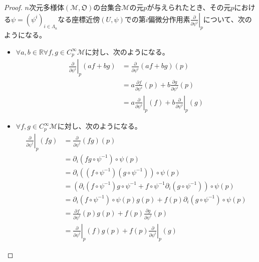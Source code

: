 \documentclass[dvipdfmx]{jsarticle}
\begin{document}
\begin{proof}
  $n$次元多様体$\left(\mathcal{M},\mathfrak{O}\right)$の台集合$\mathcal{M}$の元$p$が与えられたとき、その元$p$における$\psi =\left(\psi^i \right)_{i\in \varLambda_n }$なる座標近傍$\left(U,\psi\right)$での第$i$偏微分作用素$\left. \frac{\partial}{\partial \psi^i }\right|_p $について、次のようになる。
  \begin{itemize}
    \item $\forall a,b\in \mathbb{R} \forall f,g \in C^\infty_p \mathcal{M} $に対し、次のようになる。
    \begin{align*}
      \left. \frac{\partial}{\partial \psi^i }\right|_p \left(af+bg\right) &= \frac{\partial }{\partial \psi^i } \left(af+bg\right) \left(p\right) \\
      &=a\frac{\partial f}{\partial \psi^i } \left(p\right) +b\frac{\partial g}{\partial \psi^i }\left(p\right) \\
      &=a\left. \frac{\partial }{\partial \psi^i } \right|_p \left(f\right) +b\left. \frac{\partial }{\partial \psi^i } \right|_p \left(g\right) 
    \end{align*}
    \item $\forall f,g \in C^\infty_p \mathcal{M} $に対し、次のようになる。
    \begin{align*}
      \left. \frac{\partial}{\partial \psi^i }\right|_p \left(fg\right) &= \frac{\partial }{\partial \psi^i } \left(fg\right) \left(p\right) \\
      &= \partial_i \left(fg\circ \psi^{-1} \right) \circ \psi \left(p\right) \\
      &= \partial_i \left(\left(f\circ \psi^{-1} \right) \left(g\circ \psi^{-1} \right)\right) \circ \psi \left(p\right) \\
      &= \left( \partial_i \left(f\circ \psi^{-1} \right) g\circ \psi^{-1} +f\circ \psi^{-1} \partial_i \left(g\circ \psi^{-1} \right)\right) \circ \psi \left(p\right) \\
      &= \partial_i \left(f\circ \psi^{-1} \right) \circ \psi \left(p\right) g\left(p\right) +f\left(p\right) \partial_i \left(g\circ \psi^{-1} \right) \circ \psi \left(p\right) \\
      &=\frac{\partial f}{\partial \psi^i } \left(p\right) g\left(p\right) +f\left(p\right) \frac{\partial g}{\partial \psi^i } \left(p\right) \\
      &=\left. \frac{\partial}{\partial \psi^i }\right|_p \left(f\right) g\left(p\right) +f\left(p\right) \left. \frac{\partial}{\partial \psi^i }\right|_p \left(g\right)
    \end{align*}

\end{itemize}
\end{proof}
\end{document}
